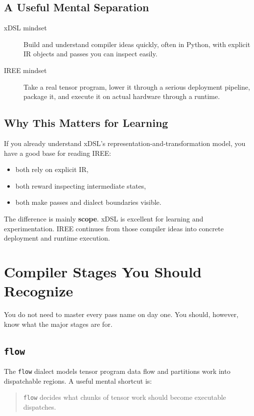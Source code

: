 \documentclass[11pt,a4paper]{article}
\begin{document}
\subsection{A Useful Mental Separation}

\begin{description}
    \item[xDSL mindset] Build and understand compiler ideas quickly, often in Python, with explicit IR objects and passes you can inspect easily.
    \item[IREE mindset] Take a real tensor program, lower it through a serious deployment pipeline, package it, and execute it on actual hardware through a runtime.
\end{description}

\subsection{Why This Matters for Learning}

If you already understand xDSL's representation-and-transformation model, you have a good base for reading IREE:
\begin{itemize}
    \item both rely on explicit IR,
    \item both reward inspecting intermediate states,
    \item both make passes and dialect boundaries visible.
\end{itemize}

The difference is mainly \textbf{scope}. xDSL is excellent for learning and experimentation. IREE continues from those compiler ideas into concrete deployment and runtime execution.

\section{Compiler Stages You Should Recognize}

You do not need to master every pass name on day one. You should, however, know what the major stages are for.

\subsection{\texttt{flow}}

The \texttt{flow} dialect models tensor program data flow and partitions work into dispatchable regions. A useful mental shortcut is:

\begin{quote}
\texttt{flow} decides what chunks of tensor work should become executable dispatches.
\end{quote}
\end{document}
